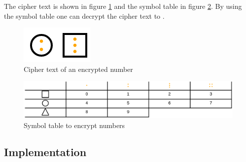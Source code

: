 \begin{example}
    The cipher text is shown in figure \ref{fig:cipher_number} and the symbol table in figure \ref{fig:symbol_table}. By using the symbol table one can decrypt the cipher text to .
\end{example}

\begin{figure} 
    \centering
    \includegraphics[width=0.2 \columnwidth]{figures/cipher_number.png}
    \caption{Cipher text of an encrypted number} 
    \label{fig:cipher_number} 
\end{figure}

\begin{figure} 
    \centering
    \includegraphics[width=1.0 \columnwidth]{figures/symbol_table.png}
    \caption{Symbol table to encrypt numbers} 
    \label{fig:symbol_table} 
\end{figure}

\subsection{Implementation}



